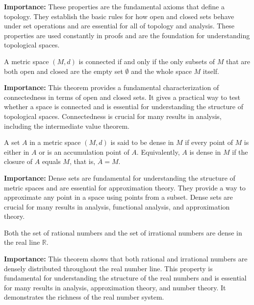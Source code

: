 \noindent\textbf{Importance:} These properties are the fundamental axioms that define a topology. They establish the basic rules for how open and closed sets behave under set operations and are essential for all of topology and analysis. These properties are used constantly in proofs and are the foundation for understanding topological spaces.



\begin{theorem}
A metric space $(M,d)$ is connected if and only if the only subsets of $M$ that are both open and closed are the empty set $\emptyset$ and the whole space $M$ itself.
\end{theorem}

\noindent\textbf{Importance:} This theorem provides a fundamental characterization of connectedness in terms of open and closed sets. It gives a practical way to test whether a space is connected and is essential for understanding the structure of topological spaces. Connectedness is crucial for many results in analysis, including the intermediate value theorem.



\begin{definition}
A set $A$ in a metric space $(M,d)$ is said to be dense in $M$ if every point of $M$ is either in $A$ or is an accumulation point of $A$. Equivalently, $A$ is dense in $M$ if the closure of $A$ equals $M$, that is, $\overline{A} = M$.
\end{definition}

\noindent\textbf{Importance:} Dense sets are fundamental for understanding the structure of metric spaces and are essential for approximation theory. They provide a way to approximate any point in a space using points from a subset. Dense sets are crucial for many results in analysis, functional analysis, and approximation theory.



\begin{theorem}
Both the set of rational numbers and the set of irrational numbers are dense in the real line $\mathbb{R}$.
\end{theorem}

\noindent\textbf{Importance:} This theorem shows that both rational and irrational numbers are densely distributed throughout the real number line. This property is fundamental for understanding the structure of the real numbers and is essential for many results in analysis, approximation theory, and number theory. It demonstrates the richness of the real number system.





